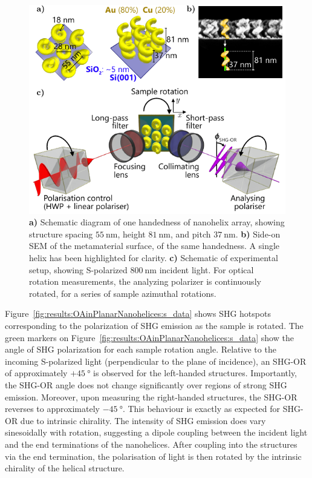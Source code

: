 \begin{figure}[htb!]	
    \centering	
    \includegraphics[scale=1.0]{./figures/results/OAinPlanarNanohelices/setup.pdf}
    \caption{\label{fig:results:OAinPlanarNanohelices:setup}
    \textbf{a)} Schematic diagram of one handedness of nanohelix array, showing structure spacing $\SI{55}{\nano\m}$, height $\SI{81}{\nano\m}$, and pitch $\SI{37}{\nano\m}$. \textbf{b)} Side-on SEM of the metamaterial surface, of the same handedness. A single helix has been highlighted for clarity. \textbf{c)} Schematic of experimental setup, showing S-polarized $\SI{800}{\nano\m}$ incident light. For optical rotation measurements, the analyzing polarizer is continuously rotated, for a series of sample azimuthal rotations.}	
\end{figure}

Figure~\ref{fig:results:OAinPlanarNanohelices:s_data} shows SHG hotspots corresponding to the polarization of SHG emission as the sample is rotated. The green markers on Figure~\ref{fig:results:OAinPlanarNanohelices:s_data} show the angle of SHG polarization for each sample rotation angle. Relative to the incoming S-polarized light (perpendicular to the plane of incidence), an SHG-OR of approximately $+\SI{45}{\degree}$ is observed for the left-handed structures. Importantly, the SHG-OR angle does not change significantly over regions of strong SHG emission.
Moreover, upon measuring the right-handed structures, the SHG-OR reverses to approximately $-\SI{45}{\degree}$. This behaviour is exactly as expected for SHG-OR due to intrinsic chirality. The intensity of SHG emission does vary sinesoidally with rotation, suggesting a dipole coupling between the incident light and the end terminations of the nanohelices. After coupling into the structures via the end termination, the polarisation of light is then rotated by the intrinsic chirality of the helical structure.


